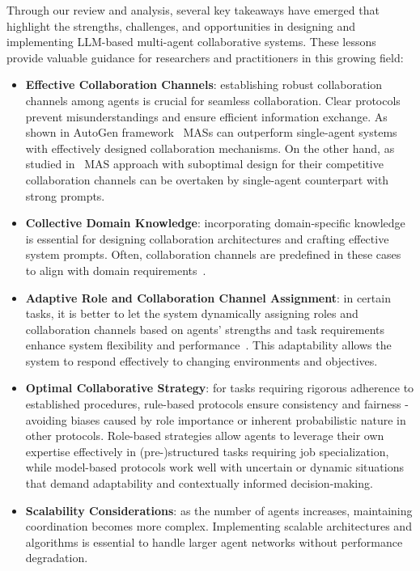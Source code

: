 \documentclass[acmsmall,nonacm]{acmart}
\begin{document}
        Through our review and analysis, several key takeaways have emerged that highlight the strengths, challenges, and opportunities in designing and implementing LLM-based multi-agent collaborative systems. These lessons provide valuable guidance for researchers and practitioners in this growing field:
        
        \begin{itemize}
            \item \textbf{Effective Collaboration Channels}: establishing robust collaboration channels among agents is crucial for seamless collaboration. Clear protocols prevent misunderstandings and ensure efficient information exchange. As shown in AutoGen framework~\cite{wu2024autogen} MASs can outperform single-agent systems with effectively designed collaboration mechanisms. On the other hand, as studied in~\cite{wang-etal-2024-rethinking-bounds} MAS approach with suboptimal design for their competitive collaboration channels can be overtaken by single-agent counterpart with strong prompts.
            \item \textbf{Collective Domain Knowledge}: incorporating domain-specific knowledge is essential for designing collaboration architectures and crafting effective system prompts. Often, collaboration channels are predefined in these cases to align with domain requirements~\cite{chen-etal-2024-comm,islam-etal-2024-mapcoder,10.1145/3626772.3657669}.
            \item \textbf{Adaptive Role and Collaboration Channel Assignment}: in certain tasks, it is better to let the system dynamically assigning roles and collaboration channels based on agents' strengths and task requirements enhance system flexibility and performance~\cite{dong-etal-2024-villageragent}. This adaptability allows the system to respond effectively to changing environments and objectives.
            \item \textbf{Optimal Collaborative Strategy}: for tasks requiring rigorous adherence to established procedures, rule-based protocols ensure consistency and fairness - avoiding biases caused by role importance or inherent probabilistic nature in other protocols. Role-based strategies allow agents to leverage their own expertise effectively in (pre-)structured tasks requiring job specialization, while model-based protocols work well with uncertain or dynamic situations that demand adaptability and contextually informed decision-making.
            \item \textbf{Scalability Considerations}: as the number of agents increases, maintaining coordination becomes more complex. Implementing scalable architectures and algorithms is essential to handle larger agent networks without performance degradation.

\end{itemize}
\end{document}
